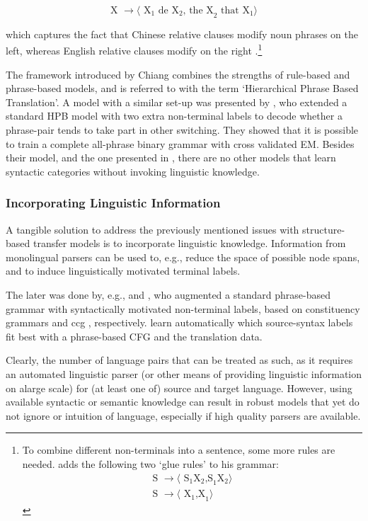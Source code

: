 \documentclass{report}
\theoremstyle{definition}
\theoremstyle{plain}
\begin{document}
\[
\text{X } \rightarrow \langle\text{ X}_1 \text{ de X}_2 \text{, the X}_2 \text{ that X}_1\rangle
\]

which captures the fact that Chinese relative clauses modify noun phrases on the left, whereas English relative clauses modify on the right \citep{chiang2007hierarchical}.\footnote{To combine different non-terminals into a sentence, some more rules are needed. \cite{chiang2007hierarchical} adds the following two `glue rules' to his grammar:\begin{align*}
 \text{S } \rightarrow \langle\text{ S}_1\text{X}_2 \text{,S}_1\text{X}_2\rangle\\
\text{S } \rightarrow \langle\text{ X}_1 \text{,X}_1\rangle 
\end{align*}

}

The framework introduced by Chiang combines the strengths of rule-based and phrase-based models, and is referred to with the term `Hierarchical Phrase Based Translation'. A model with a similar set-up was presented by \cite{mylonakis2010learning}, who extended a standard HPB model with two extra non-terminal labels to decode whether a phrase-pair tends to take part in other switching. They showed that it is possible to train a complete all-phrase binary grammar with cross validated EM. Besides their model, and the one presented in \cite{blunsom2008bayesian}, there are no other models that learn syntactic categories without invoking linguistic knowledge.


\subsubsection{Incorporating Linguistic Information}

A tangible solution to address the previously mentioned issues with structure-based transfer models is to incorporate linguistic knowledge. Information from monolingual parsers can be used to, e.g., reduce the space of possible node spans, and to induce linguistically motivated terminal labels.

The later was done by, e.g., \cite{zollmann2006syntax} and \cite{almaghout2010ccg}, who augmented a standard phrase-based grammar with syntactically motivated non-terminal labels, based on constituency grammars and ccg \citep{steedman2011combinatory}, respectively. \cite{mylonakis2011learning} learn automatically which source-syntax labels fit best with a phrase-based CFG and the translation data.

Clearly, the number of language pairs that can be treated as such, as it requires an automated linguistic parser (or other means of providing linguistic information on alarge scale) for (at least one of) source and target language. However, using available syntactic or semantic knowledge can result in robust models that yet do not ignore or intuition of language, especially if high quality parsers are available.
\end{document}
